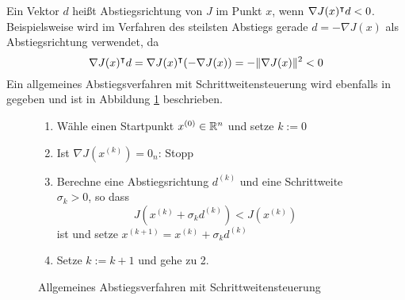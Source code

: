  Ein Vektor $d$ heißt Abstiegsrichtung von $J$ im Punkt $x$, wenn $\nabla J(x)^\intercal d<0$. Beispielsweise wird im Verfahren des steilsten Abstiegs gerade $d=- \nabla J(x)$ als Abstiegsrichtung verwendet, da 
\[
\nabla J(x)^\intercal d = \nabla J(x)^\intercal (-\nabla J(x)) = - \|\nabla J(x)\|^2 <0                                                                                                                                                                                                                                                                        \]
Ein allgemeines Abstiegsverfahren mit Schrittweitensteuerung wird ebenfalls in \cite[S. 69, Verfahren 4.1.4]{alt2002nichtlineare} gegeben und ist in Abbildung \ref{alg:genSteepestDescent} beschrieben.
\begin{figure}[H]
\begin{framed}
 \begin{enumerate}
  \item Wähle einen Startpunkt $x^{(0)}\in \mathbb{R}^n$ und setze $k:=0$
  \item Ist $\nabla J(x^{(k)})=0_n$: Stopp
  \item Berechne eine Abstiegsrichtung $d^{(k)}$ und eine Schrittweite $\sigma_k>0$, so dass
  \[
   J(x^{(k)} + \sigma_k d^{(k)}) < J(x^{(k)})
  \]
  ist und setze $x^{(k+1)} = x^{(k)}+\sigma_k d^{(k)}$
  \item Setze $k:=k+1$ und gehe zu 2.
 \end{enumerate}
\end{framed}
\caption{Allgemeines Abstiegsverfahren mit Schrittweitensteuerung}
\label{alg:genSteepestDescent}
\end{figure}

